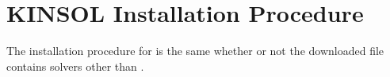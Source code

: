\chapter{KINSOL Installation Procedure}\label{s:install}

The installation procedure for {\kinsol} is the same whether 
or not the downloaded
file contains {\sundials} solvers other than {\kinsol}.

